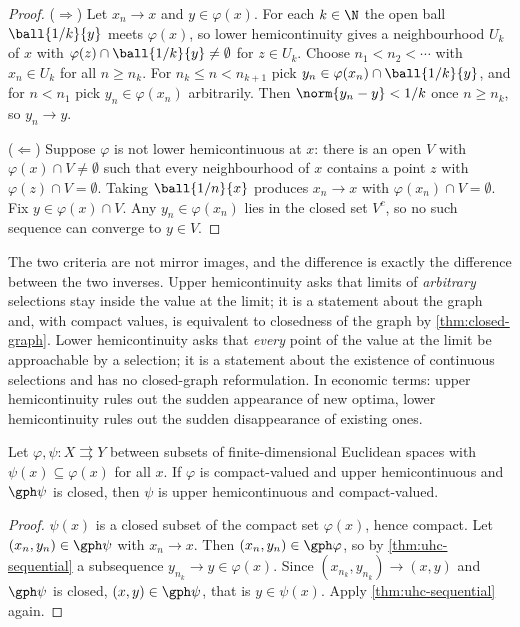 \begin{proof}
	($\Rightarrow$) Let $x_n\to x$ and $y\in\varphi(x)$. For each $k\in\N$ the open
	ball $\ball{1/k}{y}$ meets $\varphi(x)$, so lower hemicontinuity gives a
	neighbourhood $U_k$ of $x$ with $\varphi(z)\cap\ball{1/k}{y}\neq\emptyset$ for
	$z\in U_k$. Choose $n_1<n_2<\cdots$ with $x_n\in U_k$ for all $n\geq n_k$. For
	$n_k\leq n<n_{k+1}$ pick $y_n\in\varphi(x_n)\cap\ball{1/k}{y}$, and for
	$n<n_1$ pick $y_n\in\varphi(x_n)$ arbitrarily. Then
	$\norm{y_n-y}<1/k$ once $n\geq n_k$, so $y_n\to y$.

	($\Leftarrow$) Suppose $\varphi$ is not lower hemicontinuous at $x$: there is an
	open $V$ with $\varphi(x)\cap V\neq\emptyset$ such that every neighbourhood of
	$x$ contains a point $z$ with $\varphi(z)\cap V=\emptyset$. Taking
	$\ball{1/n}{x}$ produces $x_n\to x$ with $\varphi(x_n)\cap V=\emptyset$. Fix
	$y\in\varphi(x)\cap V$. Any $y_n\in\varphi(x_n)$ lies in the closed set
	$V^{c}$, so no such sequence can converge to $y\in V$.
\end{proof}

\begin{remark}\label{rem:hemicontinuity-asymmetry}
	The two criteria are not mirror images, and the difference is exactly the
	difference between the two inverses. Upper hemicontinuity asks that limits of
	\emph{arbitrary} selections stay inside the value at the limit; it is a
	statement about the graph and, with compact values, is equivalent to closedness
	of the graph by \autoref{thm:closed-graph}. Lower hemicontinuity asks that
	\emph{every} point of the value at the limit be approachable by a selection; it
	is a statement about the existence of continuous selections and has no
	closed-graph reformulation. In economic terms: upper hemicontinuity rules out
	the sudden appearance of new optima, lower hemicontinuity rules out the sudden
	disappearance of existing ones.
\end{remark}

\begin{corollary}\label{cor:closed-subcorrespondence}
	Let $\varphi,\psi\colon X\rightrightarrows Y$ between subsets of finite-dimensional
	Euclidean spaces with $\psi(x)\subseteq\varphi(x)$ for all $x$. If $\varphi$ is
	compact-valued and upper hemicontinuous and $\gph\psi$ is closed, then $\psi$ is
	upper hemicontinuous and compact-valued.
\end{corollary}

\begin{proof}
	$\psi(x)$ is a closed subset of the compact set $\varphi(x)$, hence compact. Let
	$(x_n,y_n)\in\gph\psi$ with $x_n\to x$. Then $(x_n,y_n)\in\gph\varphi$, so by
	\autoref{thm:uhc-sequential} a subsequence $y_{n_k}\to y\in\varphi(x)$. Since
	$(x_{n_k},y_{n_k})\to(x,y)$ and $\gph\psi$ is closed, $(x,y)\in\gph\psi$, that
	is $y\in\psi(x)$. Apply \autoref{thm:uhc-sequential} again.
\end{proof}

